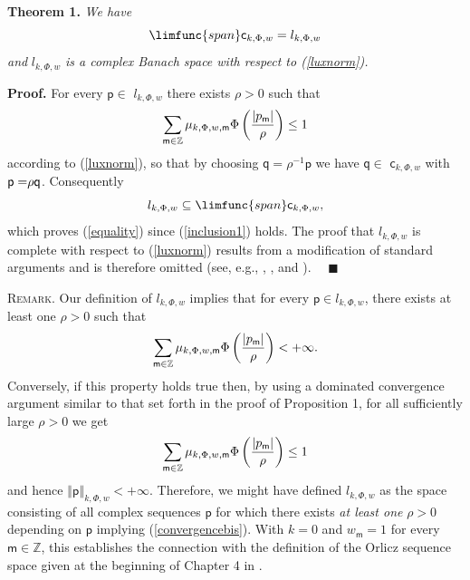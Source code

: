 \documentclass{article}
\begin{document}
\bigskip

\textbf{Theorem 1.} \textit{We have}%
\begin{equation}
\limfunc{span}\mathsf{c}_{k,\Phi ,w}=l_{k,\Phi ,w}  \label{equality}
\end{equation}%
\textit{and }$l_{k,\Phi ,w}$ \textit{is a complex Banach space with respect
to (\ref{luxnorm}).}

\bigskip

\textbf{Proof.} For every $\mathsf{p}\in $ $l_{k,\Phi ,w}$ there exists $%
\rho >0$ such that 
\begin{equation*}
\sum_{\mathsf{m}\in \mathbb{Z}}\mu _{k,\Phi ,w,\mathsf{m}}\Phi \left( \frac{%
\left\vert p_{\mathsf{m}}\right\vert }{\rho }\right) \leq 1
\end{equation*}%
according to (\ref{luxnorm}), so that by choosing $\mathsf{q}=\rho ^{-1}%
\mathsf{p}$ we have $\mathsf{q}\in $ $\mathsf{c}_{k,\Phi ,w}$ with $\mathsf{%
p=}\rho \mathsf{q}$. Consequently%
\begin{equation*}
l_{k,\Phi ,w}\subseteq \limfunc{span}\mathsf{c}_{k,\Phi ,w},
\end{equation*}%
which proves (\ref{equality}) since (\ref{inclusion1}) holds. The proof that 
$l_{k,\Phi ,w}$ is complete with respect to (\ref{luxnorm}) results from a
modification of standard arguments and is therefore omitted (see, e.g., \cite%
{adamsfournier}, \cite{krasnorut}, \cite{raoren1} and \cite{raoren2}). \ \ $%
\blacksquare $

\bigskip

\textsc{Remark.} Our definition of $l_{k,\Phi ,w}$ implies that for every $%
\mathsf{p}\in l_{k,\Phi ,w}$, there exists at least one $\rho >0$ such that%
\begin{equation}
\sum_{\mathsf{m}\in \mathbb{Z}}\mu _{k,\Phi ,w,\mathsf{m}}\Phi \left( \frac{%
\left\vert p_{\mathsf{m}}\right\vert }{\rho }\right) <+\infty .
\label{convergencebis}
\end{equation}%
\newline
Conversely, if this property holds true then, by using a dominated
convergence argument similar to that set forth in the proof of Proposition
1, for all sufficiently large $\rho >0$ we get%
\begin{equation*}
\sum_{\mathsf{m}\in \mathbb{Z}}\mu _{k,\Phi ,w,\mathsf{m}}\Phi \left( \frac{%
\left\vert p_{\mathsf{m}}\right\vert }{\rho }\right) \leq 1
\end{equation*}%
and hence $\left\Vert \mathsf{p}\right\Vert _{k,\Phi ,w}<+\infty .$
Therefore, we might have defined $l_{k,\Phi ,w}$ as the space consisting of
all complex sequences $\mathsf{p}$ for which there exists \textit{at least
one }$\rho >0$ depending on $\mathsf{p}$ implying (\ref{convergencebis}).
With $k=0$ and $w_{\mathsf{m}}=1$ for every $\mathsf{m}\in \mathbb{Z}$, this
establishes the connection with the definition of the Orlicz sequence space
given at the beginning of Chapter 4 in \cite{lindenstrausstra}.
\end{document}
